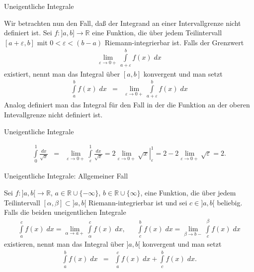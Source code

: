\documentclass[german]{beamer}
\newcommand{\bq}{\begin{eqnarray*}}
\newcommand{\eq}{\end{eqnarray*}}
\newcommand{\eps}{\varepsilon}
\begin{document}
\begin{frame}{Uneigentliche Integrale}

Wir betrachten nun den Fall, da{\ss} der Integrand an einer Intervallgrenze nicht definiert ist.
Sei $f:]a,b] \rightarrow \mathbb R$ eine Funktion, die \"uber jedem Teilintervall $[a+\eps,b]$ mit
$0<\eps<(b-a)$ Riemann-integrierbar ist. Falls der Grenzwert
\bq
 \lim\limits_{\eps\rightarrow 0+} \int\limits_{a+\eps}^b f(x) \; dx
\eq
existiert, nennt man das Integral \"uber $[a,b]$ konvergent und man setzt
\bq
 \int\limits_{a}^b f(x) \; dx
 & = & 
 \lim\limits_{\eps\rightarrow 0+} \int\limits_{a+\eps}^b f(x) \; dx
\eq
Analog definiert man das Integral f\"ur den Fall in der die Funktion an der oberen Intevallgrenze nicht
definiert ist.

\end{frame}

\begin{frame}{Uneigentliche Integrale}

\begin{example}
\bq
 \int\limits_0^1 \frac{dx}{\sqrt{x}}
 & = &
 \lim\limits_{\eps\rightarrow 0+} \int\limits_\eps^1 \frac{dx}{\sqrt{x}}
 =
 2 \lim\limits_{\eps\rightarrow 0+} \left. \sqrt{x} \right|_\eps^1
 =
 2 - 2 \lim\limits_{\eps\rightarrow 0+} \sqrt{\eps}
 = 
 2.
\eq
\end{example}

\end{frame}

\begin{frame}{Uneigentliche Integrale: Allgemeiner Fall}

Sei $f: ]a,b[ \rightarrow \mathbb R$, 
$a\in {\mathbb R} \cup \{-\infty\}$,
$b\in {\mathbb R} \cup \{\infty\}$,
eine Funktion, die \"uber jedem Teilintervall $[\alpha,\beta] \subset ]a,b[$ Riemann-integrierbar ist und sei
$c\in ]a,b[$ beliebig.
Falls die beiden uneigentlichen Integrale
\bq
 \int\limits_a^c f(x)\;dx = \lim\limits_{\alpha\rightarrow a+} \int\limits_\alpha^c f(x)\;dx,
 & &
 \int\limits_c^b f(x)\;dx = \lim\limits_{\beta\rightarrow b-} \int\limits_c^\beta f(x)\;dx
\eq
existieren, nennt man das Integral \"uber $]a,b[$ konvergent und man setzt
\bq
 \int\limits_a^b f(x)\;dx
 & = & \int\limits_a^c f(x)\;dx + \int\limits_c^b f(x)\;dx.
\eq

\end{frame}
\end{document}
